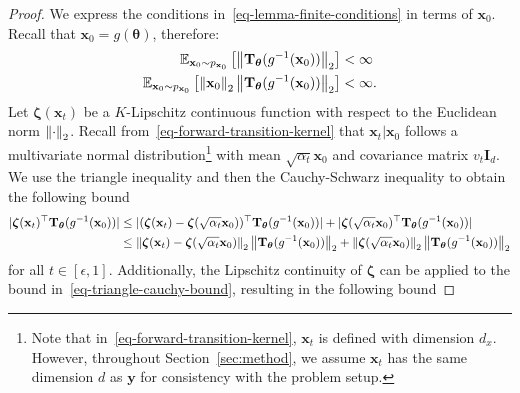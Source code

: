 \begin{proof}
We express the conditions in~\eqref{eq-lemma-finite-conditions} in terms of $\mathbf{x}_{0}$. Recall that $\mathbf{x}_0 = g(\boldsymbol{\theta})$, therefore:
\begin{equation}
\label{eq-lemma-finite-conditions-x0}
\begin{aligned}
\mathbb{E}_{\mathbf{x}_{0}\sim  p_{\mathbf{x}_{0}}}\left[\left\lVert \mathbf{T}_{\boldsymbol{\theta}}(g^{-1}(\mathbf{x}_{0})) \right\rVert_2\right] &< \infty \\
\mathbb{E}_{\mathbf{x}_{0}\sim  p_{\mathbf{x}_{0}}}\left[\left\lVert \mathbf{x}_{0} \right\rVert_2\left\lVert \mathbf{T}_{\boldsymbol{\theta}}(g^{-1}(\mathbf{x}_{0})) \right\rVert_2\right] &< \infty.
\end{aligned}
\end{equation}
Let $\boldsymbol{\zeta}(\mathbf{x}_t)$ be a $K$-Lipschitz continuous function with respect to the Euclidean norm $\left\lVert \cdot \right\rVert_2$. Recall from~\eqref{eq-forward-transition-kernel} that $\mathbf{x}_t\vert\mathbf{x}_0$ follows a multivariate normal distribution\footnote{Note that in~\eqref{eq-forward-transition-kernel}, $\mathbf{x}_t$ is defined with dimension $d_x$. However, throughout Section~\ref{sec:method}, we assume $\mathbf{x}_t$ has the same dimension $d$ as $\mathbf{y}$ for consistency with the problem setup.} with mean $\sqrt{\alpha_t}\mathbf{x}_0$ and covariance matrix $v_{t}\mathbf{I}_{d}$. We use the triangle inequality and then the Cauchy-Schwarz inequality to obtain the following bound 
\begin{equation}
\label{eq-triangle-cauchy-bound}
\begin{aligned}
\vert\boldsymbol{\zeta}(\mathbf{x}_t)^{\top} \mathbf{T}_{\boldsymbol{\theta}}(g^{-1}(\mathbf{x}_0)) \vert &\leq  \vert(\boldsymbol{\zeta}(\mathbf{x}_t)- \boldsymbol{\zeta}(\sqrt{\alpha_t}\mathbf{x}_0))^{\top} \mathbf{T}_{\boldsymbol{\theta}}(g^{-1}(\mathbf{x}_0)) \vert + \vert\boldsymbol{\zeta}(\sqrt{\alpha_t}\mathbf{x}_0)^{\top} \mathbf{T}_{\boldsymbol{\theta}}(g^{-1}(\mathbf{x}_0))\vert \\
&\leq\left\lVert \boldsymbol{\zeta}(\mathbf{x}_t)- \boldsymbol{\zeta}(\sqrt{\alpha_t}\mathbf{x}_0) \right\rVert_2\left\lVert \mathbf{T}_{\boldsymbol{\theta}}(g^{-1}(\mathbf{x}_0)) \right\rVert_2 + \left\lVert \boldsymbol{\zeta}(\sqrt{\alpha_t}\mathbf{x}_0) \right\rVert_2\left\lVert \mathbf{T}_{\boldsymbol{\theta}}(g^{-1}(\mathbf{x}_0)) \right\rVert_2
\end{aligned}
\end{equation}
for all $t\in[\epsilon,1]$. Additionally, the Lipschitz continuity of $\boldsymbol{\zeta}$ can be applied to the bound in~\eqref{eq-triangle-cauchy-bound}, resulting in the following bound

\end{proof}
